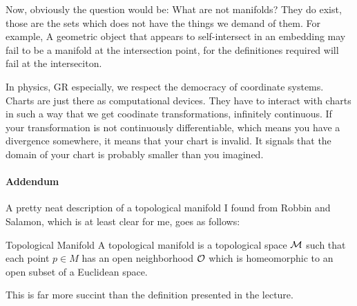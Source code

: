 		Now, obviously the question would be: What are not manifolds? They do exist, those are the sets which does not have
		the things we demand of them. For example, A geometric object that appears to self-intersect in an embedding may fail to be a manifold at the intersection point, 
		for the definitiones required will fail at the interseciton.

		In physics, GR especially, we respect the democracy of coordinate systems. Charts are just there as computational devices.
		They have to interact with charts in such a way that we get coodinate transformations, infinitely continuous. If your transformation
		is not continuously differentiable, which means you have a divergence somewhere, it means that your chart is invalid. It signals that 
		the domain of your chart is probably smaller than you imagined.
			
	\paragraph{Addendum}
		A pretty neat description of a topological manifold I found from Robbin and Salamon, which is at least clear for me, goes as follows:
		\begin{definition}{Topological Manifold}
			A topological manifold is a topological space $\mathcal M$ such
			that each point $p\in M$ has an open neighborhood $\mathcal O$ which is homeomorphic
			to an open subset of a Euclidean space.	    
		\end{definition}
		This is far more succint than the definition presented in the lecture.
		

				
			

		


			



		
		

		
		
		
		

